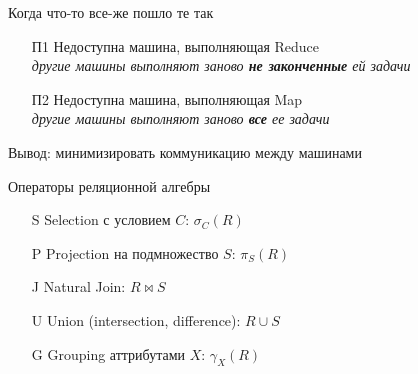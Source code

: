 \documentclass[10pt,a4paper]{beamer}
\begin{document}

\begin{frame}{Когда что-то все-же пошло те так}

\begin{itemize}
\item[П1] Недоступна машина, выполняющая Reduce \\
{\it другие машины выполняют заново {\bf не законченные} ей задачи}
\item [П2] Недоступна машина, выполняющая Map \\
{\it другие машины выполняют заново {\bf все} ее задачи}
\end{itemize}

Вывод: минимизировать коммуникацию между машинами

\end{frame}


\begin{frame}{Операторы реляционной алгебры}

\begin{itemize}
\item[S] Selection с условием $C$: $\sigma_C(R)$
\item[P] Projection на подмножество $S$: $\pi_S(R)$
\item[J] Natural Join: $R \Join S$
\item[U] Union (intersection, difference): $R \cup S$
\item[G] Grouping аттрибутами $X$: $\gamma_X(R)$
\end{itemize}

\end{frame}

\end{document}
